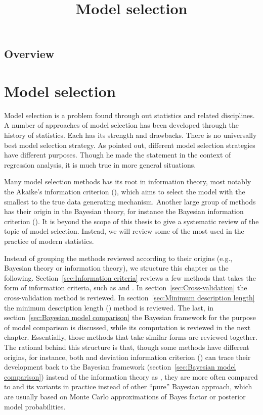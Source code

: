 \ifx\inthesis\undefined %

\title{Model selection}

\maketitle
\section{Overview}
\else %
\chapter{Model selection}
\label{cha:Model selection}
\fi %

Model selection is a problem found through out statistics and related
disciplines. A number of approaches of model selection has been developed
through the history of statistics. Each has its strength and drawbacks. There
is no universally best model selection strategy. As
\cite[][chap.~4]{Myers:1990wt} pointed out, different model selection
strategies have different purposes.  Though he made the statement in the
context of regression analysis, it is much true in more general situations.

Many model selection methods has its root in information theory, most notably
the Akaike's information criterion (\aic), which aims to select the model with
the smallest \kl \cite{Kullback:1951va} to the true data generating mechanism.
Another large group of methods has their origin in the Bayesian theory, for
instance the Bayesian information criterion (\bic). It is beyond the scope of
this thesis to give a systematic review of the topic of model selection.
Instead, we will review some of the most used in the practice of modern
statistics.

Instead of grouping the methods reviewed according to their origins (e.g.,
Bayesian theory or information theory), we structure this chapter as the
following. Section~\ref{sec:Information criteria} reviews a few methods that
takes the form of information criteria, such as \aic and \bic. In
section~\ref{sec:Cross-validation} the cross-validation method is reviewed. In
section~\ref{sec:Minimum description length} the minimum description length
(\mdl) method is reviewed. The last, in section~\ref{sec:Bayesian model
  comparison} the Bayesian framework for the purpose of model comparison is
discussed, while its computation is reviewed in the next chapter. Essentially,
those methods that take similar forms are reviewed together. The rational
behind this structure is that, though some methods have different origins, for
instance, both \bic and deviation information criterion (\dic) can trace their
development back to the Bayesian framework (section~\ref{sec:Bayesian model
  comparison}) instead of the information theory as \aic, they are more often
compared to \aic and its variants in practice instead of other ``pure''
Bayesian approach, which are usually based on Monte Carlo approximations of
Bayes factor or posterior model probabilities.

